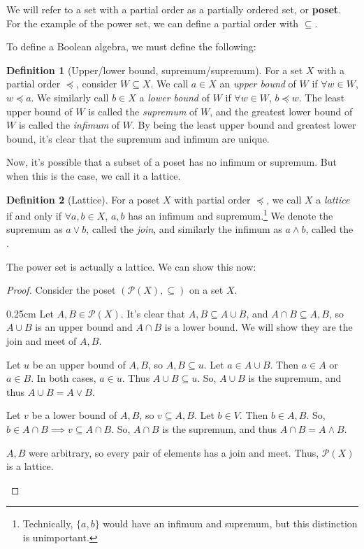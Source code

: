 \documentclass[10pt, letterpaper]{article}
\newcommand{\set}[1]{\{#1\}}
\newcommand{\powerset}[1]{\mathcal{P}(#1)}
\newenvironment{tabOver}[1]
{\begin{adjustwidth}{#1cm}{}}{\end{adjustwidth}}
\theoremstyle{definition}
\newtheorem{definition}{Definition}[section]
\begin{document}
We will refer to a set with a partial order as a partially ordered set, or \textbf{poset}.
For the example of the power set, we can define a partial order with \(\subseteq\).

To define a Boolean algebra, we must define the following:
\begin{definition}[Upper/lower bound, supremum/supremum]
	For a set \(X\) with a partial order \(\preceq\), consider \(W\subseteq X\).
	We call \(a\in X\) an \textit{upper bound} of \(W\) if \(\forall w\in W\), \(w\preceq a\).
	We similarly call \(b\in X\) a 
	\textit{lower bound} of \(W\) if \(\forall w\in W\), \(b\preceq w\).
	The least upper bound of \(W\) is called the \textit{supremum} of \(W\),
	and the greatest lower bound of \(W\) is called the \textit{infimum} of \(W\).
	By being the least upper bound and greatest lower bound, it's clear that
	the supremum and infimum are unique.
\end{definition}

Now, it's possible that a subset of a poset has no infimum or supremum.
But when this is the case, we call it a lattice.

\begin{definition}[Lattice]\label{def_lattice}
	For a poset \(X\) with partial order \(\preceq\), we call \(X\) a \textit{lattice}
	if and only if \(\forall a,b\in X\), \(a,b\) has an infimum and supremum.\footnote{
		Technically, \(\set{a,b}\) would have an infimum and supremum,
		but this distinction is unimportant.}
	We denote the supremum as \(a\vee b\), called the \textit{join},
	and similarly the infimum as \(a\wedge b\), called the .
\end{definition}

The power set is actually a lattice. We can show this now:
\begin{proof}
	Consider the poset \((\powerset{X}, \subseteq)\) on a set \(X\).
	\begin{tabOver}{0.25}
	Let \(A,B\in\powerset{X}\). It's clear that \(A, B\subseteq A\cup B\),
	and \(A\cap B\subseteq A,B\), so \(A\cup B\) is an upper bound and
	\(A\cap B\) is a lower bound. We will show they are the join and meet of \(A,B\).

	Let \(u\) be an upper bound of \(A,B\), so \(A,B\subseteq u\). Let \(a\in A\cup B\).
	Then \(a\in A\) or \(a\in B\). In both cases, \(a\in u\). Thus \(A\cup B\subseteq u\).
	So, \(A\cup B\) is the supremum, and thus \(A\cup B = A\vee B\).

	Let \(v\) be a lower bound of \(A,B\), so \(v\subseteq A,B\). Let \(b\in V\).
	Then \(b\in A, B\). So, \(b\in A\cap B\implies v\subseteq A\cap B\).
	So, \(A\cap B\) is the supremum, and thus \(A\cap B = A\wedge B\).

	\(A,B\) were arbitrary, so every pair of elements has a join and meet. 
	Thus, \(\powerset{X}\) is a lattice.
	\end{tabOver}
\end{proof}
\end{document}
